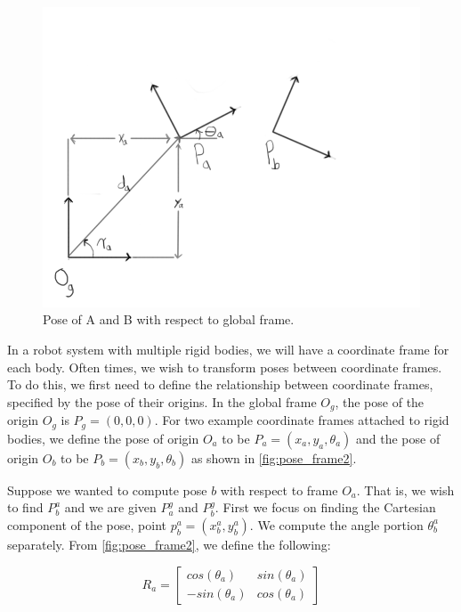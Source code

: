 \begin{figure}[htbp]
\centering
\includegraphics[keepaspectratio,width=400pt,height=0.75\textheight]{3_pose_frame2.png}
\caption{Pose of A and B with respect to global frame.}
\label{fig:pose_frame2}
\end{figure}



In a robot system with multiple rigid bodies, we will have a coordinate frame for each body. Often times, we wish to transform poses between coordinate frames. To do this, we first need to define the relationship between coordinate frames, specified by the pose of their origins. In the global frame $O_g$, the pose of the origin $O_g$ is $P_g = (0,0,0)$. For two example coordinate frames attached to rigid bodies, we define the pose of origin $O_a$ to be $P_a = (x_a, y_a, \theta_a)$ and the pose of origin $O_b$ to be $P_b = (x_b, y_b, \theta_b)$ as shown in \autoref{fig:pose_frame2}.

Suppose we wanted to compute pose $b$ with respect to frame $O_a$. That is, we wish to find $P_b^a$ and we are given $P_a^g$ and $P_b^g$. First we focus on finding the Cartesian component of the pose, point $p_b^a = (x_b^a, y_b^a)$. We compute the angle portion $\theta_b^a$ separately. From \autoref{fig:pose_frame2}, we define the following:


\begin{equation}
\label{equ:coord1}
R_a =
\begin{bmatrix}
cos(\theta_a) & sin(\theta_a) \\
-sin(\theta_a) & cos(\theta_a)
\end{bmatrix}
\end{equation}



